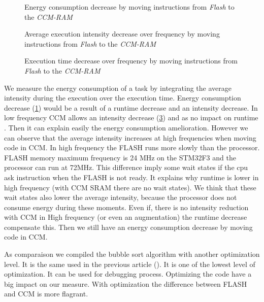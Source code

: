 \documentclass[conference]{IEEEtran}
\begin{document}
\begin{center}
    \begin{figure}[htb]
        \centering
        
        \caption[format=hang]{Energy consumption decrease by moving instructions
        from \emph{Flash} to the \emph{CCM-RAM}} \label{fig:code_ccm_energy}
    \end{figure}
    \begin{figure}[htb]
        
        \caption[format=hang]{Average execution intensity decrease over
        frequency by moving instructions from \emph{Flash} to the
        \emph{CCM-RAM}} \label{fig:code_ccm_intensity}
    \end{figure}
   \begin{figure}[htb]     
        
        \caption[format=hang]{Execution time decrease over frequency by moving
        instructions from \emph{Flash} to the \emph{CCM-RAM}}
        \label{fig:code_ccm_intensity}
    \end{figure}
\end{center}
\clearpage
We measure the energy consumption of a task by integrating the average intensity
during the execution over the execution time. Energy consumption decrease
(\ref{fig:code_ccm_energy}) would be a result of a runtime decrease and an
intensity decrease. In low frequency CCM allows an intensity decrease
(\ref{fig:code_ccm_intensity}) and as no impact on runtime \cite{mem_alloc}.
Then it can explain easily the energy consumption amelioration. However we can
observe that the average intensity increases at high frequencies when moving
code in CCM. In high frequency the FLASH runs more slowly than the processor.
FLASH memory  maximum frequency is 24 MHz on the STM32F3 and the processor can
run at 72MHz. This difference imply some wait states if the cpu ask instruction
when the FLASH is not ready. It explains why runtime is lower in high frequency
(with CCM SRAM there are no wait states). We think that these wait states also
lower the average intensity, because the processor does not consume energy
during these moments. Even if, there is no intensity reduction with CCM in High
frequency (or even an augmentation) the runtime decrease compensate this. Then
we still have an energy consumption decrease by moving code in CCM.

As comparaison we compiled the bubble sort algorithm with another optimization
level. It is the same used in the previous article (\cite{mem_alloc}). It is one
of the lowest level of optimization. It can be used for debugging process.
Optimizing the code have a big impact on our measure. With optimization the
difference between FLASH and CCM is more flagrant. 
\end{document}
